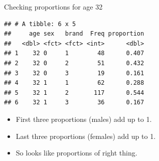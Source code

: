 \documentclass[
  ignorenonframetext,
]{beamer}
\newenvironment{Shaded}{\begin{snugshade}}{\end{snugshade}}
\newcommand{\DecValTok}[1]{\textcolor[rgb]{0.00,0.00,0.81}{#1}}
\newcommand{\KeywordTok}[1]{\textcolor[rgb]{0.13,0.29,0.53}{\textbf{#1}}}
\newcommand{\NormalTok}[1]{#1}
\newcommand{\OperatorTok}[1]{\textcolor[rgb]{0.81,0.36,0.00}{\textbf{#1}}}
\newcommand{\StringTok}[1]{\textcolor[rgb]{0.31,0.60,0.02}{#1}}
\begin{document}
\begin{frame}[fragile]{Checking proportions for age 32}
\protect\hypertarget{checking-proportions-for-age-32}{}

\small

\begin{Shaded}
\end{Shaded}

\begin{verbatim}
## # A tibble: 6 x 5
##     age sex   brand  Freq proportion
##   <dbl> <fct> <fct> <int>      <dbl>
## 1    32 0     1        48      0.407
## 2    32 0     2        51      0.432
## 3    32 0     3        19      0.161
## 4    32 1     1        62      0.288
## 5    32 1     2       117      0.544
## 6    32 1     3        36      0.167
\end{verbatim}

\normalsize

\begin{itemize}
\item
  First three proportions (males) add up to 1.
\item
  Last three proportions (females) add up to 1.
\item
  So looks like proportions of right thing.
\end{itemize}

\end{frame}
\end{document}
